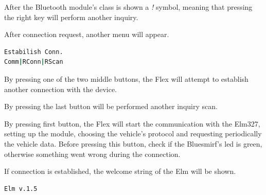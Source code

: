 \documentclass[twoside]{article}
\begin{document}
\begin{multicols}{2}
After the Bluetooth module's class is shown a \emph{!} symbol, meaning that pressing the right key will perform another inquiry.

After connection request, another menu will appear.

\begin{lstlisting}[language=bash]
Estabilish Conn.
Comm|RConn|RScan
\end{lstlisting}

By pressing one of the two middle buttons, the Flex will attempt to establish another connection with the device.

By pressing the last button will be performed another inquiry scan.

By pressing first button, the Flex will start the communication with the Elm327, setting up the module, choosing the vehicle's protocol and requesting periodically the vehicle data. Before pressing this button, check if the Bluesmirf's led is green, otherwise something went wrong during the connection.

If connection is established, the welcome string of the Elm will be shown.

\begin{lstlisting}[language=bash]
Elm v.1.5
\end{lstlisting}






\begin{thebibliography}{99} %


\end{thebibliography}
\end{multicols}
\end{document}
